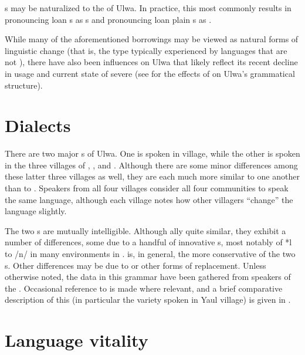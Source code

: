 s may be naturalized to the  of Ulwa. In practice, this most commonly results in pronouncing loan s as s and pronouncing loan plain  s as   .

While many of the aforementioned borrowings may be viewed as natural forms of linguistic change (that is, the type typically experienced by languages that are not ), there have also been influences on Ulwa that likely reflect its recent decline in usage and current state of severe  (see  for the effects of  on Ulwa’s grammatical structure).


\section{Dialects}\label{sec:1.5.7}


There are two major s of Ulwa. One is spoken in  village, while the other is spoken in the three villages of , , and . Although there are some minor differences among these latter three villages as well, they are each much more similar to one another than to . Speakers from all four villages consider all four communities to speak the same language, although each village notes how other villagers “change” the language slightly.

The two s are mutually intelligible. Although ally quite similar, they exhibit a number of  differences, some due to a handful of innovative s, most notably of *l to /n/ in many environments in .  is, in general, the more conservative of the two s. Other  differences may be due to  or other forms of replacement. Unless otherwise noted, the data in this grammar have been gathered from speakers of the  . Occasional reference to  is made where relevant, and a brief comparative description of this  (in particular the variety spoken in Yaul village) is given in .


\section{Language vitality}\label{sec:1.6}

